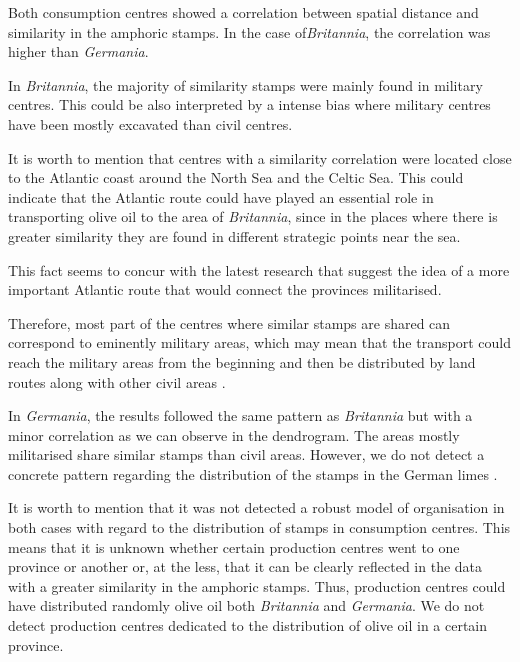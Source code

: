 \documentclass[review]{elsarticle}
\begin{document}
Both consumption centres showed a correlation between spatial distance and similarity in the amphoric stamps. In the case of\textit{Britannia}, the correlation was higher than \textit{Germania}.

In \textit{Britannia}, the majority of similarity stamps were mainly found in military centres. This could be also interpreted by a intense bias where military centres have been mostly excavated than civil centres. 

It is worth to mention that centres with a similarity correlation were located close to the Atlantic coast around the North Sea and the Celtic Sea. This could indicate that the Atlantic route could have played an essential role in transporting olive oil to the area of \textit{Britannia}, since in the places where there is greater similarity they are found in different strategic points near the sea.

This fact seems to concur with the latest research that suggest the idea of a more important Atlantic route that would connect the provinces militarised\citep{remesal_annona_1986,
remesal_provincial_2008,
carreras_atlantic_2012,
morillo_hispania_2016,rubio-campillo_provincias_2018}.

Therefore, most part of the centres where similar stamps are shared can correspond to eminently military areas, which may mean that the transport could reach the military areas from the beginning and then be distributed by land routes along with other civil areas \citep{carreras_britannia_1998,
ayllon_olive_2018}.

In \textit{Germania}, the results followed the same pattern as \textit{Britannia} but with a minor correlation as we can observe in the dendrogram. The areas mostly militarised share similar stamps than civil areas. However, we do not detect a concrete pattern regarding the distribution of the stamps in the German limes \citep{xanten2018}. 

It is worth to mention that it was not detected a robust model of organisation in both cases with regard to the distribution of stamps in consumption centres. This means
that it is unknown whether certain production centres went to one province or another or, at the
less, that it can be clearly reflected in the data with a greater similarity in the amphoric stamps. Thus, production centres could have distributed randomly olive oil both \textit{Britannia} and \textit{Germania}. We do not detect production centres dedicated to the distribution of olive oil in a certain province. 
\end{document}

